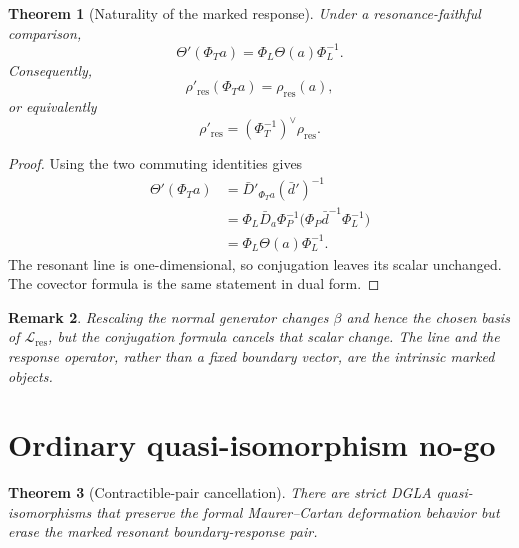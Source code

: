 \documentclass[11pt]{amsart}
\newtheorem{theorem}{Theorem}[section]
\newtheorem{remark}[theorem]{Remark}
\begin{document}
\begin{theorem}[Naturality of the marked response]
Under a resonance-faithful comparison,
\[
\boxed{
\Theta'(\Phi_Ta)=\Phi_L\Theta(a)\Phi_L^{-1}.}
\]
Consequently,
\[
\boxed{
\rho'_{\mathrm{res}}(\Phi_Ta)=\rho_{\mathrm{res}}(a),}
\]
or equivalently
\[
\rho'_{\mathrm{res}}=(\Phi_T^{-1})^\vee\rho_{\mathrm{res}}.
\]
\end{theorem}

\begin{proof}
Using the two commuting identities gives
\[
\begin{aligned}
\Theta'(\Phi_Ta)
&=\bar D'_{\Phi_Ta}(\bar d')^{-1}\\
&=\Phi_L\bar D_a\Phi_P^{-1}
       \bigl(\Phi_P\bar d^{-1}\Phi_L^{-1}\bigr)\\
&=\Phi_L\Theta(a)\Phi_L^{-1}.
\end{aligned}
\]
The resonant line is one-dimensional, so conjugation leaves its scalar unchanged.  The covector formula is the same statement in dual form.
\end{proof}

\begin{remark}
Rescaling the normal generator changes \(\beta\) and hence the chosen basis of \(\mathcal L_{\mathrm{res}}\), but the conjugation formula cancels that scalar change.  The line and the response operator, rather than a fixed boundary vector, are the intrinsic marked objects.
\end{remark}

\section{Ordinary quasi-isomorphism no-go}

\begin{theorem}[Contractible-pair cancellation]
There are strict DGLA quasi-isomorphisms that preserve the formal Maurer--Cartan deformation behavior but erase the marked resonant boundary-response pair.
\end{theorem}
\end{document}
